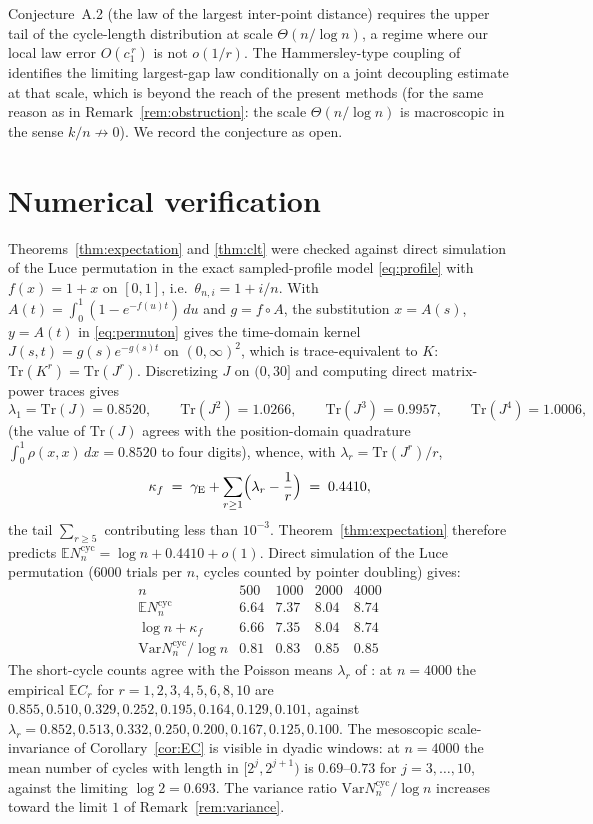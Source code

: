 \documentclass[11pt]{article}
\newcommand{\E}{\mathbb{E}}
\newcommand{\1}{\mathbf{1}}
\newcommand{\Var}{\mathrm{Var}}
\newcommand{\Tr}{\mathrm{Tr}}
\newcommand{\cyc}{\mathrm{cyc}}
\newcommand{\gE}{\gamma_{\mathrm{E}}}
\theoremstyle{remark}
\begin{document}
Conjecture~A.2 (the law of the largest inter-point distance) requires
the upper tail of the cycle-length distribution at scale
$\Theta(n/\log n)$, a regime where our local law error $O(c_1^{\,r})$
is not $o(1/r)$. The Hammersley-type coupling of \cite[Section~11]{Lon26}
identifies the limiting largest-gap law conditionally on a joint
decoupling estimate at that scale, which is beyond the reach of the
present methods (for the same reason as in
Remark~\ref{rem:obstruction}: the scale $\Theta(n/\log n)$ is
macroscopic in the sense $k/n\not\to0$). We record the conjecture as
open.

\appendix

\section{Numerical verification}\label{app:numerics}

Theorems~\ref{thm:expectation} and \ref{thm:clt} were checked against
direct simulation of the Luce permutation in the exact sampled-profile
model \eqref{eq:profile} with $f(x)=1+x$ on $[0,1]$, i.e.\
$\theta_{n,i}=1+i/n$. With $A(t)=\int_0^1(1-e^{-f(u)t})\,du$ and
$g=f\circ A$, the substitution $x=A(s)$, $y=A(t)$ in
\eqref{eq:permuton} gives the time-domain kernel
$J(s,t)=g(s)e^{-g(s)t}$ on $(0,\infty)^2$, which is trace-equivalent to
$K$: $\Tr(K^r)=\Tr(J^r)$. Discretizing $J$ on $(0,30]$ and computing
direct matrix-power traces gives
\[
\lambda_1=\Tr(J)=0.8520,\qquad
\Tr(J^2)=1.0266,\qquad
\Tr(J^3)=0.9957,\qquad
\Tr(J^4)=1.0006,
\]
(the value of $\Tr(J)$ agrees with the position-domain quadrature
$\int_0^1\rho(x,x)\,dx=0.8520$ to four digits), whence, with
$\lambda_r=\Tr(J^r)/r$,
\[
\kappa_f\;=\;\gE+\sum_{r\ge1}\Bigl(\lambda_r-\frac1r\Bigr)
\;=\;0.4410,
\]
the tail $\sum_{r\ge5}$ contributing less than $10^{-3}$.
Theorem~\ref{thm:expectation} therefore predicts
$\E N_n^{\cyc}=\log n+0.4410+o(1)$. Direct simulation of the Luce
permutation ($6000$ trials per $n$, cycles counted by pointer doubling)
gives:
\[\begin{array}{c|cccc}
n & 500 & 1000 & 2000 & 4000\\\hline
\E N_n^{\cyc} & 6.64 & 7.37 & 8.04 & 8.74\\
\log n+\kappa_f & 6.66 & 7.35 & 8.04 & 8.74\\
\Var N_n^{\cyc}/\log n & 0.81 & 0.83 & 0.85 & 0.85
\end{array}
\]
The short-cycle counts agree with the Poisson means $\lambda_r$ of
\cite[Theorem~5.1]{Lon26}: at $n=4000$ the empirical $\E C_r$ for
$r=1,2,3,4,5,6,8,10$ are $0.855,0.510,0.329,0.252,0.195,0.164,0.129,
0.101$, against $\lambda_r=0.852,0.513,0.332,0.250,0.200,0.167,0.125,
0.100$. The mesoscopic scale-invariance of Corollary~\ref{cor:EC} is
visible in dyadic windows: at $n=4000$ the mean number of cycles with
length in $[2^j,2^{j+1})$ is $0.69$--$0.73$ for $j=3,\dots,10$, against
the limiting $\log 2=0.693$. The variance ratio
$\Var N_n^{\cyc}/\log n$ increases toward the limit $1$ of
Remark~\ref{rem:variance}.
\end{document}
